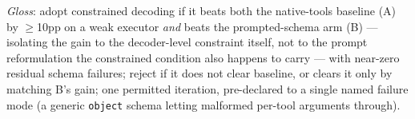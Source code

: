 \documentclass[smallcondensed,natbib]{svjour3}
\begin{document}
\noindent\emph{Gloss}: adopt constrained decoding if it beats both the
native-tools baseline (A) by $\geq$10pp on a weak executor \emph{and}
beats the prompted-schema arm (B) --- isolating the gain to the
decoder-level constraint itself, not to the prompt reformulation the
constrained condition also happens to carry --- with near-zero residual
schema failures; reject if it does not clear baseline, or clears it
only by matching B's gain; one permitted iteration, pre-declared to a
single named failure mode (a generic \texttt{object} schema letting
malformed per-tool arguments through).
\end{document}

